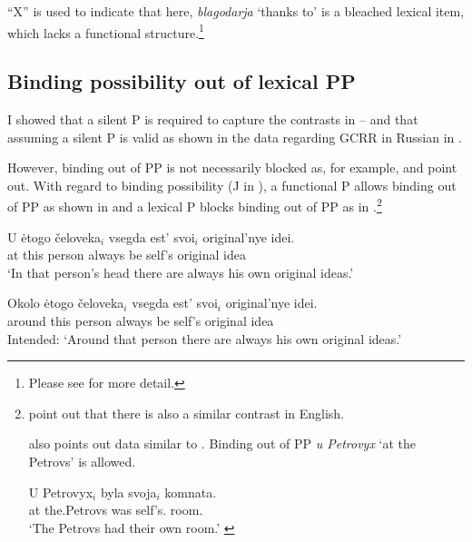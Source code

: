 \documentclass[output=paper,
]{langscibook}
\begin{document}
\noindent
``X'' is used to indicate that here, \textit{blagodarja} `thanks to' is a bleached lexical item, which lacks a functional structure.\footnote{
			Please see \citet{YadroffFranks2001} for more detail.
			}


\subsection{Binding possibility out of lexical PP}

I showed that a silent P is required to capture the contrasts in --  
and that assuming a silent P is valid as shown in the data regarding GCRR in Russian in .

However, binding out of PP is not necessarily blocked as, for example, \citet{YadroffFranks2001} and \cite{Bailyn2010} point out.
With regard to binding possibility (J in ), a functional P allows binding out of PP as shown in  and a lexical P blocks binding out of PP as in .\footnote{
			\citet{YadroffFranks2001} point out that there is also a similar contrast in English.
			\ea
\hfill \citep[74]{YadroffFranks2001}
			\z\z
			
			\noindent
			\citet{Bailyn2010} also points out data similar to .
			Binding out of PP \textit{u Petrovyx} `at the Petrovs' is allowed.			
			
			\ea\label{ppbind2}
			\gll	U Petrovyx$_i$ byla svoja$_i$ komnata.\\
					at the.Petrovs was self's.{\NOM} room.{\NOM}\\
			\glt `The Petrovs had their own room.'
			\hfill\citep[14]{Bailyn2010}
			\z}

\begin{exe}\ex \label{ppbind}
\begin{xlist}
\ex \label{ppbinda}
\gll	U ėtogo čeloveka$_i$ vsegda est' svoi$_i$ original'nye idei.\\
		at this person always be self's original idea\\\samepage
\trans `In that person's head there are always his own original ideas.'

\ex\label{ppbindb}	
\gll	* Okolo ėtogo čeloveka$_i$ vsegda est' svoi$_i$ original'nye idei.\\
		{} around this person always be self's original idea\\
\trans Intended: `Around that person there are always his own original ideas.'
\end{xlist}\samepage\hfill\citep[74]{YadroffFranks2001}
\end{exe}
\end{document}
